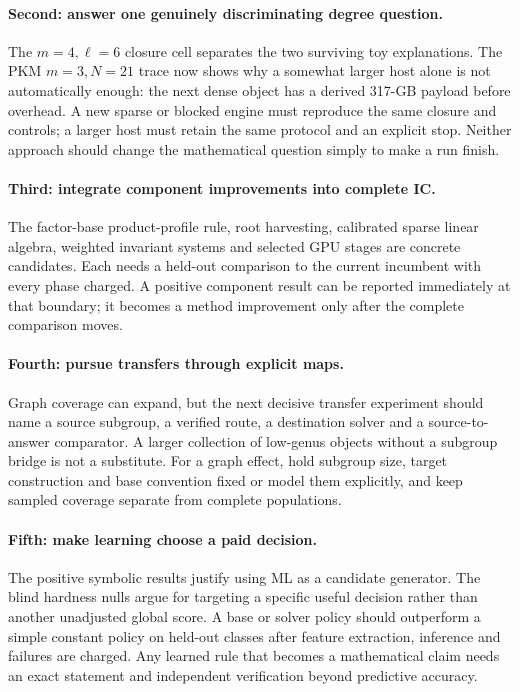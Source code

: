 \paragraph{Second: answer one genuinely discriminating degree question.}
The $m=4,\ell=6$ closure cell separates the two surviving toy
explanations. The PKM $m=3,N=21$ trace now shows why a somewhat larger
host alone is not automatically enough: the next dense object has a
derived 317-GB payload before overhead. A new sparse or blocked engine
must reproduce the same closure and controls; a larger host must retain
the same protocol and an explicit stop. Neither approach should change
the mathematical question simply to make a run finish.

\paragraph{Third: integrate component improvements into complete IC.}
The factor-base product-profile rule, root harvesting, calibrated sparse
linear algebra, weighted invariant systems and selected GPU stages are
concrete candidates. Each needs a held-out comparison to the current
incumbent with every phase charged. A positive component result can be
reported immediately at that boundary; it becomes a method improvement
only after the complete comparison moves.

\paragraph{Fourth: pursue transfers through explicit maps.}
Graph coverage can expand, but the next decisive transfer experiment
should name a source subgroup, a verified route, a destination solver
and a source-to-answer comparator. A larger collection of low-genus
objects without a subgroup bridge is not a substitute. For a graph
effect, hold subgroup size, target construction and base convention
fixed or model them explicitly, and keep sampled coverage separate
from complete populations.

\paragraph{Fifth: make learning choose a paid decision.}
The positive symbolic results justify using ML as a candidate generator.
The blind hardness nulls argue for targeting a specific useful decision
rather than another unadjusted global score. A base or solver policy
should outperform a simple constant policy on held-out classes after
feature extraction, inference and failures are charged. Any learned
rule that becomes a mathematical claim needs an exact statement and
independent verification beyond predictive accuracy.


